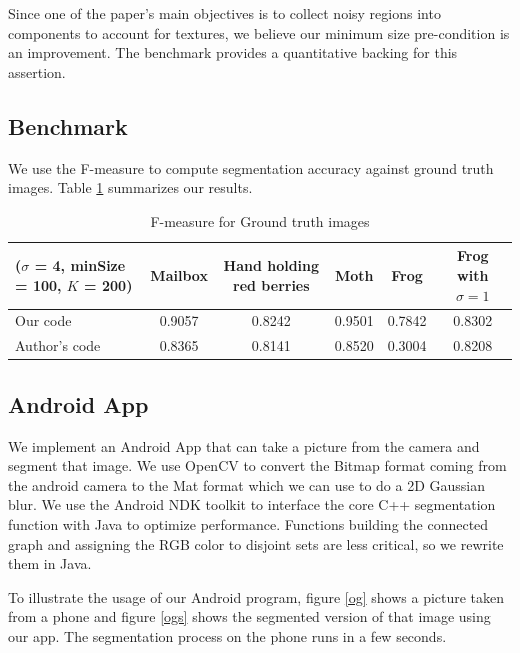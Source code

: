 \documentclass[12pt, english, titlepage]{article}
\begin{document}

Since one of the paper's main objectives is to collect noisy regions into components to account for textures, we believe our minimum size pre-condition is an improvement. The benchmark provides a quantitative backing for this assertion.

\subsection{Benchmark}

We use the F-measure to compute segmentation accuracy against ground truth images. Table \ref{bench} summarizes our results.

\begin{table}
\begin{tabular}{|p{3cm}|c|c|c|c|c|}
\hline 
($\sigma$ = 4, minSize = 100, $K$ = 200) & Mailbox & Hand holding red berries & Moth & Frog & Frog with $\sigma=1$\tabularnewline
\hline 
\hline 
Our code & 0.9057 & 0.8242 & 0.9501 & 0.7842 & 0.8302\tabularnewline
\hline 
Author's code & 0.8365 & 0.8141 & 0.8520 & 0.3004 & 0.8208\tabularnewline
\hline
\end{tabular}
\caption{F-measure for Ground truth images}
\label{bench}
\end{table}


\subsection{Android App}

We implement an Android App that can take a picture from the camera and segment that image. We use OpenCV to convert the Bitmap format coming from the android camera to the Mat format which we can use to do a 2D Gaussian blur. We use the Android NDK toolkit to interface the core C++ segmentation function with Java to optimize performance. Functions building the connected graph and assigning the RGB color to disjoint sets are less critical, so we rewrite them in Java.

To illustrate the usage of our Android program, figure \ref{og} shows a picture taken from a phone and figure \ref{ogs} shows the segmented version of that image using our app. The segmentation process on the phone runs in a few seconds.
\end{document}
